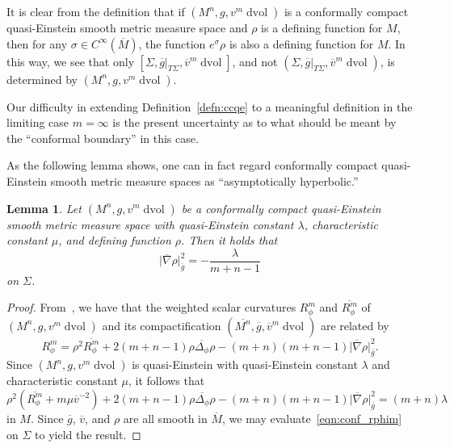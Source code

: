\documentclass{amsart}
\newtheorem{lem}[thm]{Lemma}
\theoremstyle{definition}
\theoremstyle{remark}
\numberwithin{equation}{section}
\begin{document}
It is clear from the definition that if $(M^n,g,v^m\operatorname{dvol})$ is a conformally compact quasi-Einstein smooth metric measure space and $\rho$ is a defining function for $M$, then for any $\sigma\in C^\infty(\overline{M})$, the function $e^\sigma\rho$ is also a defining function for $M$.  In this way, we see that only $[\Sigma,{\overline{g}}{\rvert}_{T\Sigma},{\overline{v}}^m\operatorname{dvol}]$, and not $(\Sigma,{\overline{g}}{\rvert}_{T\Sigma},{\overline{v}}^m\operatorname{dvol})$, is determined by $(M^n,g,v^m\operatorname{dvol})$.

Our difficulty in extending Definition~\ref{defn:ccqe} to a meaningful definition in the limiting case $m=\infty$ is the present uncertainty as to what should be meant by the ``conformal boundary'' in this case.

As the following lemma shows, one can in fact regard conformally compact quasi-Einstein smooth metric measure spaces as ``asymptotically hyperbolic.''

\begin{lem}
\label{lem:weighted_ah}
Let $(M^n,g,v^m\operatorname{dvol})$ be a conformally compact quasi-Einstein smooth metric measure space with quasi-Einstein constant $\lambda$, characteristic constant $\mu$, and defining function $\rho$.  Then it holds that
\[ {\lvert}{\overline{\nabla}}\rho{\rvert}_{\overline{g}}^2 = -\frac{\lambda}{m+n-1} \]
on $\Sigma$.
\end{lem}

\begin{proof}

From~\cite[Proposition~4.4]{Case2010a}, we have that the weighted scalar curvatures $R_\phi^m$ and $\overline{R_\phi^m}$ of $(M^n,g,v^m\operatorname{dvol})$ and its compactification $(\overline{M^n},{\overline{g}},{\overline{v}}^m\operatorname{dvol})$ are related by
\[ R_\phi^m = \rho^2\overline{R_\phi^m} + 2(m+n-1)\rho\overline{\Delta_\phi}\rho - (m+n)(m+n-1){\lvert}{\overline{\nabla}}\rho{\rvert}_{\overline{g}}^2 . \]
Since $(M^n,g,v^m\operatorname{dvol})$ is quasi-Einstein with quasi-Einstein constant $\lambda$ and characteristic constant $\mu$, it follows that
\begin{equation}
\label{eqn:conf_rphim}
\rho^2\left(\overline{R_\phi^m} + m\mu{\overline{v}}^{-2}\right) + 2(m+n-1)\rho\overline{\Delta_\phi}\rho - (m+n)(m+n-1){\lvert}{\overline{\nabla}}\rho{\rvert}_{\overline{g}}^2 = (m+n)\lambda
\end{equation}
in $M$.  Since ${\overline{g}}$, ${\overline{v}}$, and $\rho$ are all smooth in $\overline{M}$, we may evaluate~\eqref{eqn:conf_rphim} on $\Sigma$ to yield the result.
\end{proof}
\end{document}

